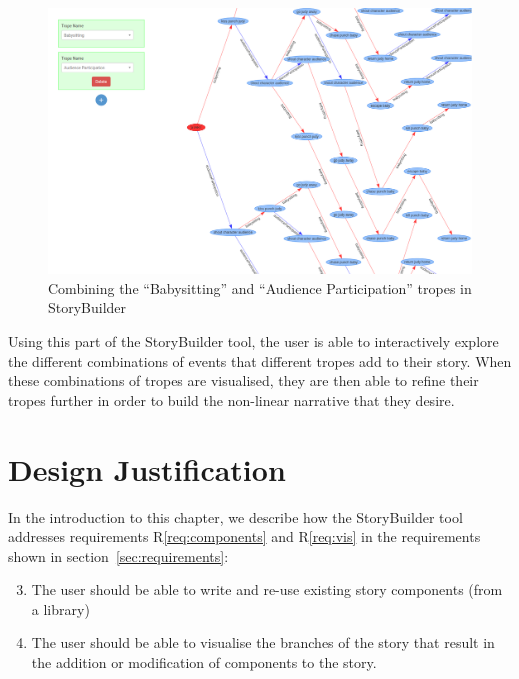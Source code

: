 \documentclass[11pt]{report}
\begin{document}
\begin{figure}[!h]
\centerline{\includegraphics[width=\textwidth]{trope-combining.png}}
\caption{Combining the ``Babysitting'' and ``Audience Participation'' tropes in StoryBuilder}\label{fig:combining-tropes}
\end{figure}

Using this part of the StoryBuilder tool, the user is able to interactively
explore the different combinations of events that different tropes add to their
story. When these combinations of tropes are visualised, they are then able to
refine their tropes further in order to build the non-linear narrative that they desire.

\section{Design Justification}


In the introduction to this chapter, we describe how the StoryBuilder tool
addresses requirements R\ref{req:components} and R\ref{req:vis} in the
requirements shown in section~\ref{sec:requirements}:

\begin{enumerate}[R1.]
  \setcounter{enumi}{2}
  \item The user should be able to write and re-use
    existing story components (from a library)
  \setcounter{enumi}{6}
  \item The user should be able to visualise the branches of the
    story that result in the addition or modification of components to the story.
\end{enumerate}
\end{document}
